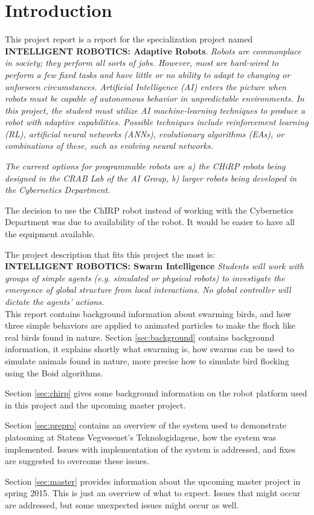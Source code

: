 \section{Introduction}
\label{sec:intro}
This project report is a report for the specialization project named\\ \textbf{INTELLIGENT ROBOTICS: Adaptive Robots}. 
\textit{Robots are commonplace in society; they perform all sorts of jobs. However, most are hard-wired to perform a few fixed tasks and have little or no ability to adapt to changing or unforseen circumstances. Artificial Intelligence (AI) enters the picture when robots must be capable of autonomous behavior in unpredictable environments. In this project, the student must utilize AI machine-learning techniques to produce a robot with adaptive capabilities. Possible techniques include reinforcement learning (RL), artificial neural networks (ANNs), evolutionary algorithms (EAs), or combinations of these, such as evolving neural networks.}

\textit{The current options for programmable robots are a) the CHiRP robots being designed in the CRAB Lab of the AI Group, b) larger robots being developed in the Cybernetics Department.}

The decision to use the ChIRP robot instead of working with the Cybernetics Department was due to availability of the robot. It would be easier to have all the equipment available.

The project description that fits this project the most is: \\\textbf{INTELLIGENT ROBOTICS: Swarm Intelligence}
\textit{Students will work with groups of simple agents (e.g. simulated or physical robots) to investigate the emergence of global structure from local interactions. No global controller will dictate the agents' actions.}\\

This report contains background information about swarming birds, and how three simple behaviors are applied to animated particles to make the flock like real birds found in nature.
Section \ref{sec:background} contains background information, it explains shortly what swarming is, how swarms can be used to simulate animals found in nature, more precise how to simulate bird flocking using the Boid algorithms.

Section \ref{sec:chirp} gives some background information on the robot platform used in this project and the upcoming master project. 

Section \ref{sec:prepro} contains an overview of the system used to demonstrate platooning at Statens Vegvesenet's Teknologidagene, how the system was implemented. Issues with implementation of the system is addressed, and fixes are suggested to overcome these issues.

Section \ref{sec:master} provides information about the upcoming master project in spring 2015. This is just an overview of what to expect. Issues that might occur are addressed, but some unexpected issues might occur as well.
